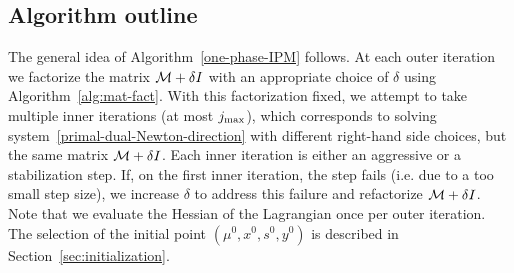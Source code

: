 \documentclass{article}
\begin{document}
\subsection{Algorithm outline}\label{sec:practical-alg-outline}

The general idea of Algorithm~\ref{one-phase-IPM} follows. At each outer iteration we factorize the matrix $\mathcal{M} + \delta I$ with an appropriate choice of $\delta$ using Algorithm~\ref{alg:mat-fact}. With this factorization fixed, we attempt to take multiple inner iterations (at most $j_{\max}$), which corresponds to solving system~\eqref{primal-dual-Newton-direction} with different right-hand side choices, but the same matrix $\mathcal{M} + \delta I$. Each inner iteration is either an aggressive or a stabilization step. If, on the first inner iteration, the step fails (i.e. due to a too small step size), we increase $\delta$ to address this failure and refactorize $\mathcal{M} + \delta I$. Note that we evaluate the Hessian of the Lagrangian once per outer iteration. The selection of the initial point $(\mu^{0}, x^{0}, s^{0}, y^{0})$ is described in Section~\ref{sec:initialization}.

\end{document}
